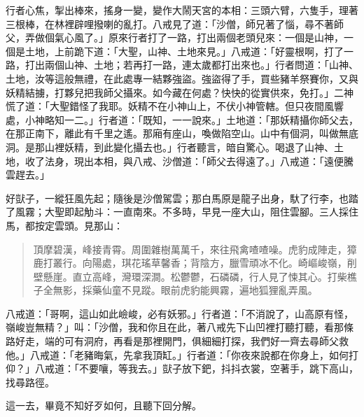 行者心焦，掣出棒來，搖身一變，變作大鬧天宮的本相：三頭六臂，六隻手，理著三根棒，在林裡辟哩撥喇的亂打。八戒見了道：「沙僧，師兄著了惱，尋不著師父，弄做個氣心風了。」原來行者打了一路，打出兩個老頭兒來：一個是山神，一個是土地，上前跪下道：「大聖，山神、土地來見。」八戒道：「好靈根啊，打了一路，打出兩個山神、土地；若再打一路，連太歲都打出來也。」行者問道：「山神、土地，汝等這般無禮，在此處專一結夥強盜。強盜得了手，買些豬羊祭賽你，又與妖精結擄，打夥兒把我師父攝來。如今藏在何處？快快的從實供來，免打。」二神慌了道：「大聖錯怪了我耶。妖精不在小神山上，不伏小神管轄。但只夜間風響處，小神略知一二。」行者道：「既知，一一說來。」土地道：「那妖精攝你師父去，在那正南下，離此有千里之遙。那廂有座山，喚做陷空山。山中有個洞，叫做無底洞。是那山裡妖精，到此變化攝去也。」行者聽言，暗自驚心。喝退了山神、土地，收了法身，現出本相，與八戒、沙僧道：「師父去得遠了。」八戒道：「遠便騰雲趕去。」

好獃子，一縱狂風先起；隨後是沙僧駕雲；那白馬原是龍子出身，馱了行李，也踏了風霧；大聖即起觔斗：一直南來。不多時，早見一座大山，阻住雲腳。三人採住馬，都按定雲頭。見那山：
\begin{quote}
頂摩碧漢，峰接青霄。周圍雜樹萬萬千，來往飛禽喳喳噪。虎豹成陣走，獐鹿打叢行。向陽處，琪花瑤草馨香；背陰方，臘雪頑冰不化。崎嶇峻嶺，削壁懸崖。直立高峰，灣環深澗。松鬱鬱，石磷磷，行人見了悚其心。打柴樵子全無影，採藥仙童不見蹤。眼前虎豹能興霧，遍地狐狸亂弄風。
\end{quote}

八戒道：「哥啊，這山如此嶮峻，必有妖邪。」行者道：「不消說了，山高原有怪，嶺峻豈無精？」叫：「沙僧，我和你且在此，著八戒先下山凹裡打聽打聽，看那條路好走，端的可有洞府，再看是那裡開門，俱細細打探，我們好一齊去尋師父救他。」八戒道：「老豬晦氣，先拿我頂缸。」行者道：「你夜來說都在你身上，如何打仰？」八戒道：「不要嚷，等我去。」獃子放下鈀，抖抖衣裳，空著手，跳下高山，找尋路徑。

這一去，畢竟不知好歹如何，且聽下回分解。
